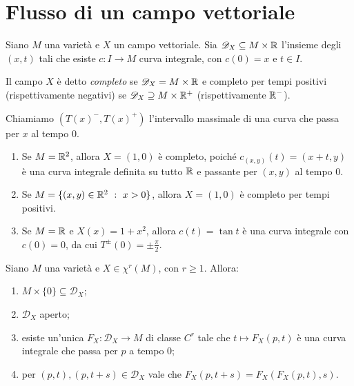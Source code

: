 \section{Flusso di un campo vettoriale} %

\begin{definition}  
	Siano $M$ una varietà e $X$ un campo vettoriale. Sia $\mathscr D_X\subseteq M\times \mathbb R$ l'insieme degli $(x,t)$ tali che esiste $c:I\to M$ curva integrale, con $c(0)=x$ e $t \in I$.
	
	Il campo $X$ è detto \emph{completo} se $\mathscr D_X=M\times \mathbb R$ e completo per tempi positivi (rispettivamente negativi) se $\mathscr D_X\supseteq M\times\mathbb R^+$ (rispettivamente $\mathbb R^-$).
	
	Chiamiamo $(T(x)^-,T(x)^+)$ l'intervallo massimale di una curva che passa per $x$ al tempo 0. 
\end{definition}

\begin{example}
\begin{enumerate}
	\item Se $M=\mathbb R^2$, allora $X=(1,0)$ è completo, poiché $c_{(x,y)}(t)=(x+t,y)$ è una curva integrale definita su tutto $\mathbb R$ e passante per $(x,y)$ al tempo 0.
	\item Se $M=\{(x,y) \in \mathbb R^2 \ :\  x>0\}$, allora $X=(1,0)$ è completo per tempi positivi.
	\item Se $M=\mathbb R$ e $X(x)=1+x^2$, allora $c(t)=\tan t$ è una curva integrale con $c(0)=0$, da cui $T^\pm(0)=\pm \frac \pi 2$.
\end{enumerate}
\end{example}

\begin{proposition} \label{prop:ProprietaDX}
	Siano $M$ una varietà e $X\in \chi^r(M)$, con $r\ge 1$. Allora:
	\begin{enumerate}
	 \item $M\times\{0\}\subseteq \mathscr D_X$; \label{PDX:ContieneM}
	 \item $\mathscr D_X$ aperto; \label{PDX:Aperto}
	 \item esiste un'unica $F_X:\mathscr D_X\to M$ di classe $C^r$ tale che $t\mapsto F_X(p,t)$ è una curva integrale che passa per $p$ a tempo 0; \label{PDX:FunzioneSuDX}
	 \item per $(p,t),(p,t+s)\in\mathscr D_X$ vale che $F_X(p,t+s)=F_X(F_X(p,t),s)$. \label{PDX:Composizione}
	\end{enumerate}
\end{proposition}

